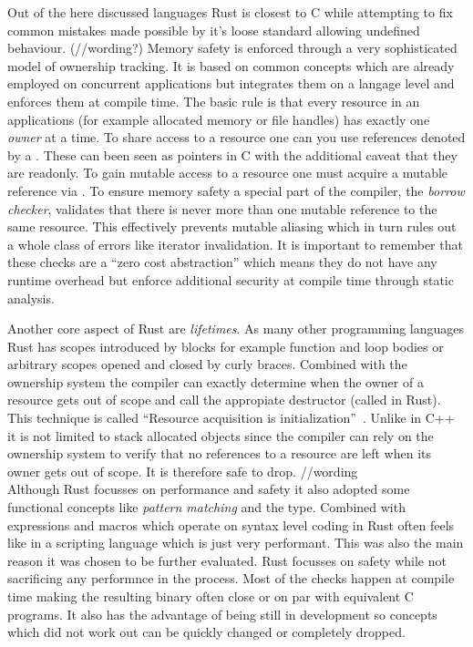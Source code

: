 Out of the here discussed languages Rust is closest to C while attempting to fix common mistakes made possible by it's loose standard allowing undefined behaviour. (//wording?) Memory safety is enforced through a very sophisticated model of ownership tracking. It is based on common concepts which are already employed on concurrent applications but integrates them on a langage level and enforces them at compile time. The basic rule is that every resource in an applications (for example allocated memory or file handles) has exactly one \textit{owner} at a time. To share access to a resource one can you use references denoted by a \mdinline{\&}. These can been seen as pointers in C with the additional caveat that they are readonly. To gain mutable access to a resource one must acquire a mutable reference via . To ensure memory safety a special part of the compiler, the \textit{borrow checker}, validates that there is never more than one mutable reference to the same resource. This effectively prevents mutable aliasing which in turn rules out a whole class of errors like iterator invalidation. It is important to remember that these checks are a ``zero cost abstraction'' which means they do not have any runtime overhead but enforce additional security at compile time through static analysis.

Another core aspect of Rust are \textit{lifetimes}. As many other programming languages Rust has scopes introduced by blocks for example function and loop bodies or arbitrary scopes opened and closed by curly braces. Combined with the ownership system the compiler can exactly determine when the owner of a resource gets out of scope and call the appropiate destructor (called  in Rust). This technique is called ``Resource acquisition is initialization''~\cite[p. 389]{evolution_c++}. Unlike in C++ it is not limited to stack allocated objects since the compiler can rely on the ownership system to verify that no references to a resource are left when its owner gets out of scope. It is therefore safe to drop. //wording
\\


Although Rust focusses on performance and safety it also adopted some functional concepts like \textit{pattern matching} and the  type. Combined with  expressions and macros which operate on syntax level coding in Rust often feels like in a scripting language which is just very performant. This was also the main reason it was chosen to be further evaluated. Rust focusses on safety while not sacrificing any performnce in the process. Most of the checks happen at compile time making the resulting binary often close or on par with equivalent C programs. It also has the advantage of being still in development so concepts which did not work out can be quickly changed or completely dropped.

